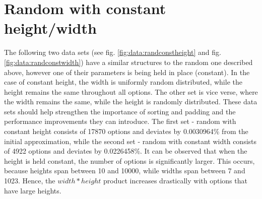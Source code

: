 \section{Random with constant height/width}
The following two data sets (see fig. \ref{fig:data:randconstheight} and fig. \ref{fig:data:randconstwidth}) have a similar structures to the random one described above, however one of their parameters is being held in place (constant). In the case of constant height, the width is uniformly random distributed, while the height remains the same throughout all options. The other set is vice verse, where the width remains the same, while the height is randomly distributed. These data sets should help strengthen the importance of sorting and padding and the performance improvements they can introduce. The first set - random with constant height consists of 17870 options and deviates by 0.0030964\% from the initial approximation, while the second set - random with constant width consists of 4922 options and deviates by 0.0226458\%. It can be observed that when the height is held constant, the number of options is significantly larger. This occurs, because heights span between 10 and 10000, while widths span between 7 and 1023. Hence, the $width*height$ product increases drastically with options that have large heights. 

